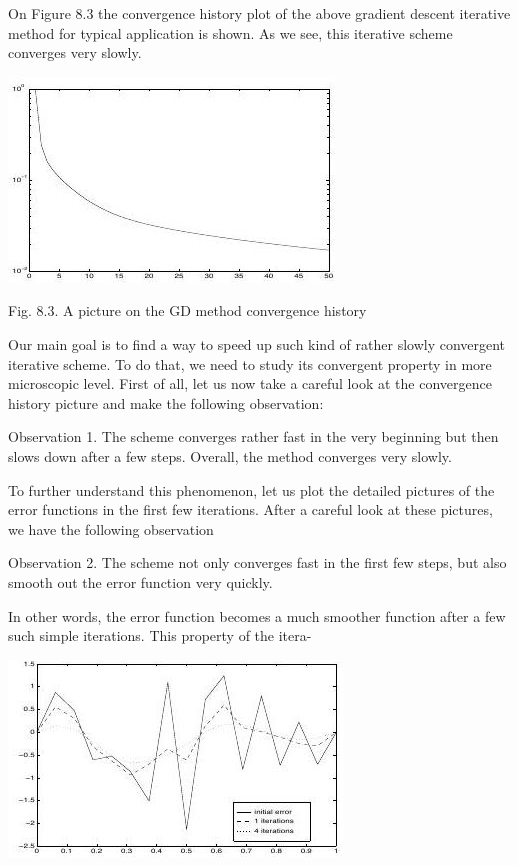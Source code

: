 \documentclass[10pt]{article}
\begin{document}
On Figure $8.3$ the convergence history plot of the above gradient descent iterative method for typical application is shown. As we see, this iterative scheme converges very slowly.

\includegraphics[max width=\textwidth]{2022_01_06_7eec630b8b060fb00b5bg-06}

Fig. 8.3. A picture on the GD method convergence history

Our main goal is to find a way to speed up such kind of rather slowly convergent iterative scheme. To do that, we need to study its convergent property in more microscopic level. First of all, let us now take a careful look at the convergence history picture and make the following observation:

Observation 1. The scheme converges rather fast in the very beginning but then slows down after a few steps. Overall, the method converges very slowly.

To further understand this phenomenon, let us plot the detailed pictures of the error functions in the first few iterations. After a careful look at these pictures, we have the following observation

Observation 2. The scheme not only converges fast in the first few steps, but also smooth out the error function very quickly.

In other words, the error function becomes a much smoother function after a few such simple iterations. This property of the itera-

\includegraphics[max width=\textwidth]{2022_01_06_7eec630b8b060fb00b5bg-07}
\end{document}

